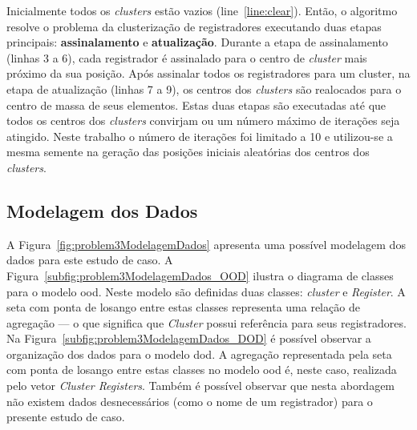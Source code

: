 Inicialmente todos os \textit{clusters} estão vazios (line~\ref{line:clear}).
Então, o algoritmo resolve o problema da clusterização de registradores executando duas etapas principais: \textbf{assinalamento} e \textbf{atualização}.
Durante a etapa de assinalamento (linhas 3 a 6), cada registrador é assinalado para o centro de \textit{cluster} mais próximo da  sua posição.
Após assinalar todos os registradores para um cluster, na etapa de atualização (linhas 7 a 9), os centros dos \textit{clusters} são realocados para o centro de massa de seus elementos.
Estas duas etapas são executadas até que todos os centros dos \textit{clusters} convirjam ou um número máximo de iterações seja atingido.
Neste trabalho o número de iterações foi limitado a 10 e utilizou-se a mesma semente na geração das posições iniciais aleatórias dos centros dos \textit{clusters}.



\subsection{Modelagem dos Dados}
\label{subsec:modelagemDadosProblem3}
A Figura~\ref{fig:problem3ModelagemDados} apresenta uma possível modelagem dos dados para este estudo de caso.
A Figura~\ref{subfig:problem3ModelagemDados_OOD} ilustra o diagrama de classes para o modelo \ac{ood}.
Neste modelo são definidas duas classes: \textit{cluster} e \textit{Register}.
A seta com ponta de losango entre estas classes representa  uma relação de agregação --- o que significa que \textit{Cluster} possui referência para seus registradores.
Na Figura~\ref{subfig:problem3ModelagemDados_DOD} é possível observar a organização dos dados para o modelo \ac{dod}.
A agregação representada pela seta com ponta de losango entre estas classes no modelo \ac{ood} é, neste caso, realizada pelo vetor \textit{Cluster Registers}.
Também é possível observar que nesta abordagem não existem dados desnecessários (como o nome de um registrador) para o presente estudo de caso.

